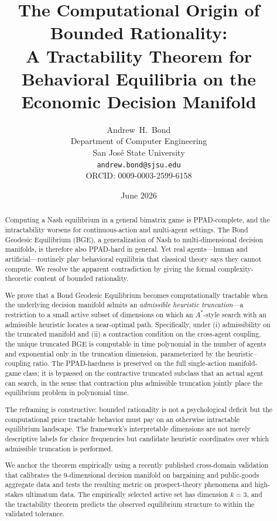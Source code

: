 \documentclass[11pt]{article}
\title{\textbf{The Computational Origin of Bounded Rationality:\\
A Tractability Theorem for Behavioral Equilibria on the Economic Decision Manifold}}
\author{Andrew~H.~Bond\\
Department of Computer Engineering\\
San Jos\'{e} State University\\
\texttt{andrew.bond@sjsu.edu}\\
ORCID: 0009-0003-2599-6158}
\date{June 2026}
\theoremstyle{definition}
\theoremstyle{remark}
\begin{document}
\maketitle

\begin{abstract}
\noindent
Computing a Nash equilibrium in a general bimatrix game is PPAD-complete, and the intractability worsens
for continuous-action and multi-agent settings. The Bond Geodesic Equilibrium (BGE), a generalization
of Nash to multi-dimensional decision manifolds, is therefore also PPAD-hard in general. Yet real
agents---human and artificial---routinely play behavioral equilibria that classical theory says they
cannot compute. We resolve the apparent contradiction by giving the formal complexity-theoretic
content of bounded rationality.

We prove that a Bond Geodesic Equilibrium becomes computationally tractable when the underlying
decision manifold admits an \emph{admissible heuristic truncation}---a restriction to a small active
subset of dimensions on which an $A^*$-style search with an admissible heuristic locates a
near-optimal path. Specifically, under (i) admissibility on the truncated manifold and (ii) a
contraction condition on the cross-agent coupling, the unique truncated BGE is computable in time
polynomial in the number of agents and exponential only in the truncation dimension, parameterized
by the heuristic--coupling ratio. The PPAD-hardness is preserved on the full single-action manifold-game
class; it is bypassed on the contractive truncated subclass that an actual agent can search, in
the sense that contraction plus admissible truncation jointly place the equilibrium problem in
polynomial time.

The reframing is constructive: bounded rationality is not a psychological deficit but the
computational price tractable behavior must pay on an otherwise intractable equilibrium landscape.
The framework's interpretable dimensions are not merely descriptive labels for choice frequencies
but candidate heuristic coordinates over which admissible truncation is performed.

We anchor the theorem empirically using a recently published cross-domain validation that calibrates
the 9-dimensional decision manifold on bargaining and public-goods aggregate data and tests the
resulting metric on prospect-theory phenomena and high-stakes ultimatum data. The empirically
selected active set has dimension $k=3$, and the tractability theorem predicts the observed
equilibrium structure to within the validated tolerance.
\end{abstract}
\end{document}
